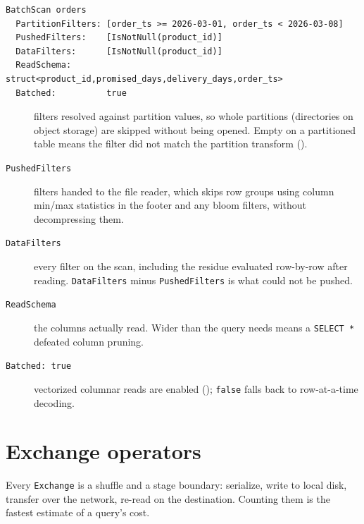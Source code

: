 \begin{lstlisting}[language=text,numbers=none,caption={A scan node's fields},captionpos=b]
BatchScan orders
  PartitionFilters: [order_ts >= 2026-03-01, order_ts < 2026-03-08]
  PushedFilters:    [IsNotNull(product_id)]
  DataFilters:      [IsNotNull(product_id)]
  ReadSchema:       struct<product_id,promised_days,delivery_days,order_ts>
  Batched:          true
\end{lstlisting}

\begin{description}
  \item[] filters resolved against partition values, so
        whole partitions (directories on object storage) are skipped without
        being opened. Empty on a partitioned table means the filter did not match
        the partition transform ().
  \item[\texttt{PushedFilters}] filters handed to the file reader, which skips
        row groups using column min/max statistics in the footer and any bloom
        filters, without decompressing them.
  \item[\texttt{DataFilters}] every filter on the scan, including the residue
        evaluated row-by-row after reading. \texttt{DataFilters} minus
        \texttt{PushedFilters} is what could not be pushed.
  \item[\texttt{ReadSchema}] the columns actually read. Wider than the query
        needs means a \texttt{SELECT *} defeated column pruning.
  \item[\texttt{Batched: true}] vectorized columnar reads are enabled
        (); \texttt{false} falls
        back to row-at-a-time decoding.
\end{description}

\section{Exchange operators}
\label{sec:c-exchange}

Every \texttt{Exchange} is a shuffle and a stage boundary: serialize, write to
local disk, transfer over the network, re-read on the destination. Counting them
is the fastest estimate of a query's cost.

